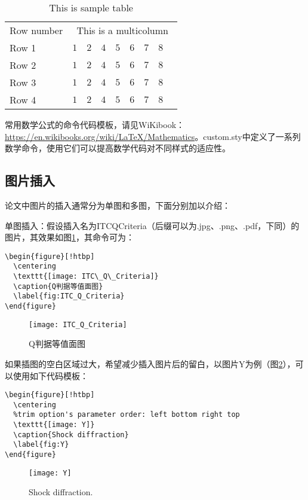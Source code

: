 \begin{table}[!htbp]
    \centering
    \footnotesize%
    \setlength{\tabcolsep}{4pt}%
    \renewcommand{\arraystretch}{1.2}%
    \begin{tabular}{lcccccccc}
        \hline\hline
        Row number & \multicolumn{8}{c}{This is a multicolumn} \\
        \cline{2-9}%
        Row 1 & $1$ & $2$ & $4$ & $5$ & $6$ & $7$ & $8$\\
        \hline
        Row 2 & $1$ & $2$ & $4$ & $5$ & $6$ & $7$ & $8$\\
        \hline
        Row 3 & $1$ & $2$ & $4$ & $5$ & $6$ & $7$ & $8$\\
        \hline
        Row 4 & $1$ & $2$ & $4$ & $5$ & $6$ & $7$ & $8$\\
        \hline\hline
    \end{tabular}
    \caption{This is sample table}
    \label{tab:sample}
\end{table}

常用数学公式的命令代码模板，请见WiKibook：\url{https://en.wikibooks.org/wiki/LaTeX/Mathematics}。custom.sty中定义了一系列数学命令，使用它们可以提高数学代码对不同样式的适应性。

\subsection{图片插入}

论文中图片的插入通常分为单图和多图，下面分别加以介绍：

单图插入：假设插入名为ITC\textunderscore Q\textunderscore Criteria（后缀可以为.jpg、.png、.pdf，下同）的图片，其效果如图\ref{fig:ITC_Q_Criteria}，其命令可为：
\begin{verbatim}
\begin{figure}[!htbp]
  \centering
  \texttt{[image: ITC\_Q\_Criteria]}
  \caption{Q判据等值面图}
  \label{fig:ITC_Q_Criteria}
\end{figure}
\end{verbatim}
\begin{figure}[!htbp]
  \centering
  \texttt{[image: ITC\_Q\_Criteria]}
  \caption{Q判据等值面图}
  \label{fig:ITC_Q_Criteria}
\end{figure}

如果插图的空白区域过大，希望减少插入图片后的留白，以图片Y为例（图\ref{fig:Y}），可以使用如下代码模板：
\begin{verbatim}
\begin{figure}[!htbp]
  \centering
  %trim option's parameter order: left bottom right top
  \texttt{[image: Y]}
  \caption{Shock diffraction}
  \label{fig:Y}
\end{figure}
\end{verbatim}
\begin{figure}[!htbp]
  \centering
  \texttt{[image: Y]}
  \caption{Shock diffraction.}
  \label{fig:Y}
\end{figure}

